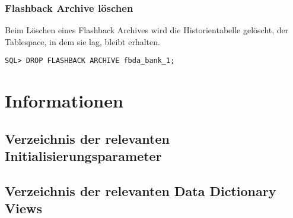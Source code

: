         \subsubsection{Flashback Archive l\"oschen}
          Beim L\"oschen eines Flashback Archives wird die Historientabelle gel\"oscht, der Tablespace, in dem sie lag, bleibt erhalten.
          \begin{lstlisting}[caption={Flashback Data Archive deaktivieren},label=admin1743,language=oracle_sql]
SQL> DROP FLASHBACK ARCHIVE fbda_bank_1;
          \end{lstlisting}
    \section{Informationen}
      \subsection{Verzeichnis der relevanten Initialisierungsparameter}
        \begin{literaturinternet}
          \item \cite{REFRN10264}
        \end{literaturinternet}
      \subsection{Verzeichnis der relevanten Data Dictionary Views}
        \begin{literaturinternet}
          \item \cite{ADFNS01005}
          \item \cite{REFRN23342}
          \item \cite{sthref2545}
          \item \cite{sthref2202}
          \item \cite{REFRN23719}
          \item \cite{sthref2010}
        \end{literaturinternet}
